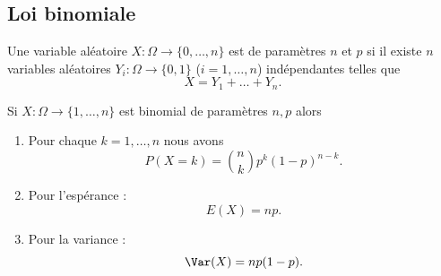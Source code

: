 \subsection{Loi binomiale}

\begin{definition}	\label{DEFooTSYAooZSLIdY}
	Une variable aléatoire \(X \colon \Omega\to \{ 0,\ldots,n \}  \) est  de paramètres \( n\) et \( p\) si il existe \( n\) variables aléatoires \(Y_i \colon \Omega\to \{ 0,1 \}  \) (\( i=1,\ldots,n\)) indépendantes telles que
	\begin{equation}
		X=Y_1+\ldots+Y_n.
	\end{equation}
\end{definition}

\begin{proposition}    \label{PROPooIBZKooYikwjJ}
	Si \(X \colon \Omega\to \{ 1,\ldots,n \}  \) est binomial de paramètres \( n,p\) alors
	\begin{enumerate}
		\item
		      Pour chaque \( k=1,\ldots,n\) nous avons
		      \begin{equation}
			      P(X=k)=\binom{ n }{ k }p^k(1-p)^{n-k}.
		      \end{equation}
		\item
		      Pour l'espérance :
		      \begin{equation}
			      E(X)=np.
		      \end{equation}
		\item
		      Pour la variance :
		      \begin{equation}
			      \Var(X)=np(1-p).
		      \end{equation}
	\end{enumerate}
\end{proposition}

